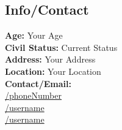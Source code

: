 \documentclass[american]{cv-class}
\begin{document}
\begin{aside}
	\section{Info/Contact}
	\textbf{Age:} Your Age \\
	\textbf{Civil Status:} Current Status \\
	\textbf{Address:} Your Address \\
	\textbf{Location:} Your Location \\
	\textbf{Contact/Email:}\\ \href{https://bit.ly/2Kd9YPc number}{/phoneNumber}\\
	\href{https://join.skype.com/invite/xxxx }{/username}\\
	\href{mailto:xxxxxx@gmail.com}{/username}
	~

\end{aside}
\end{document}
